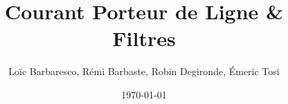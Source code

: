 \documentclass[a4paper,11pt]{report}
\title{Courant Porteur de Ligne \& Filtres}
\author{Loïc Barbaresco, Rémi Barbaste, Robin Degironde, Émeric Tosi}
\date{\today}
\begin{document}
    \maketitle{}



    \setcounter{tocdepth}{1} %
    \renewcommand{\contentsname}{Sommaire} %
    \tableofcontents{} %
    \clearpage


    
    \clearpage
    
    \clearpage

    
    \clearpage

    \listoffigures
    \clearpage
\end{document}
